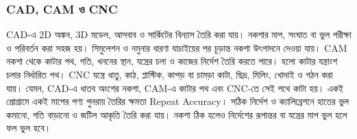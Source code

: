 \subsubsection{CAD, CAM ও CNC}
CAD-এ 2D অঙ্কন, 3D মডেল, আসবাব ও সার্কিটের বিন্যাস তৈরি করা যায়। নকশার মাপ, সংঘাত বা ভুল পরীক্ষা ও পরিবর্তন করা সহজ হয়। সিমুলেশন ও নমুনার ধারণা যাচাইয়ের পর চূড়ান্ত নকশা উৎপাদনে দেওয়া যায়।
CAM নকশা থেকে কাটার পথ, গতি, খননের স্থান, যন্ত্রের চলা ও কাজের নির্দেশ তৈরি করতে পারে।  হলো কাটার যন্ত্রাংশ চলার নির্ধারিত পথ।
CNC যন্ত্রে ধাতু, কাঠ, প্লাস্টিক, কাপড় বা চামড়া কাটা, ছিদ্র, মিলিং, খোদাই ও গঠন করা যায়। যেমন, CAD-এ ধাতব অংশের নকশা, CAM-এ কাটার পথ এবং CNC-তে সেই পথে কাটা হয়। একই প্রোগ্রামে একই মাপের পণ্য পুনরায় তৈরির ক্ষমতা Repeat Accuracy। সঠিক নির্দেশ ও ক্যালিব্রেশনে হাতের ভুল কমানো, গতি বাড়ানো ও জটিল আকৃতি তৈরি করা যায়। নকশা ঠিক হলেও নির্দেশের রূপান্তর বা যন্ত্রের মাপ ভুল হলে ফল ভুল হবে।
